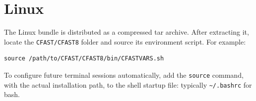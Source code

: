 \section{Linux}

The Linux bundle is distributed as a compressed tar archive. After extracting it, locate the \texttt{CFAST/CFAST8} folder and source its environment script. For example:
\begin{lstlisting}
source /path/to/CFAST/CFAST8/bin/CFASTVARS.sh
\end{lstlisting}
To configure future terminal sessions automatically, add the \texttt{source} command, with the actual installation path, to the shell startup file: typically \texttt{\textasciitilde/.bashrc} for bash.



\label{last_page}

